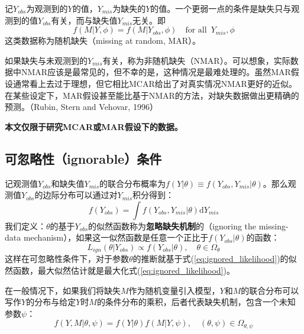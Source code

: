 \documentclass[aps,pre,12pt,preprint,onecolumn,showpacs,showkeys,AutoFakeBold]{revtex4-1}
\def \d {\mathrm d}
\begin{document}
    记$Y_{obs}$为观测到的$Y$的值，$Y_{mis}$为缺失的$Y$的值。一个更弱一点的条件是缺失只与观测到的值$Y_{obs}$有关，而与缺失值$Y_{mis}$无关。即
    \begin{equation}\label{eq:MAR}
        f(M\vert Y,\phi)=f(M\vert Y_{obs} ,\phi)\quad \text{for all }\, Y_{mis}, \phi 
    \end{equation}
    这类数据称为随机缺失（missing at random, MAR）。
    
    如果缺失与未观测到的$Y_{mis}$有关，称为非随机缺失（NMAR）。可以想象，实际数据中NMAR应该是最常见的，但不幸的是，这种情况是最难处理的。虽然MAR假设通常看上去过于理想，但它相比MCAR给出了对真实情况NMAR更好的近似。在某些设定下，MAR假设甚至能比基于NMAR的方法，对缺失数据做出更精确的预测。（Rubin, Stern and Vehovar, 1996）

    \textbf{本文仅限于研究MCAR或MAR假设下的数据。}

    \subsection{可忽略性（ignorable）条件}
    记观测值$Y_{obs}$和缺失值$Y_{mis}$的联合分布概率为$f(Y\vert \theta)\equiv f(Y_{obs}, Y_{mis}\vert \theta)$。那么观测值$Y_{obs}$的边际分布可以通过对$Y_{mis}$积分得到：
    \begin{equation}
        f(Y_{obs})=\int f(Y_{obs}, Y_{mis}\vert \theta)\d Y_{mis}
    \end{equation}
    我们定义：$\theta$的基于$Y_{obs}$的似然函数称为\textbf{忽略缺失机制}的（ignoring the missing-data mechanism），如果这一似然函数是任意一个正比于$f(Y_{obs}\vert \theta)$的函数：
    \begin{equation}\label{eq:ignored_likelihood}
        L_{ign}(\theta\vert Y_{obs})\propto f(Y_{obs}\vert \theta),\quad \theta \in \Omega_\theta
    \end{equation}
    这样在可忽略性条件下，对于参数$\theta$的推断就基于式(\ref{eq:ignored_likelihood})的似然函数，最大似然估计就是最大化式(\ref{eq:ignored_likelihood})。

    在一般情况下，如果我们将缺失$M$作为随机变量引入模型，$Y$和$M$的联合分布可以写作$Y$的分布与给定$Y$时$M$的条件分布的乘积，后者代表缺失机制，包含一个未知参数$\psi$：
    \begin{equation}\label{eq:joint}
        f(Y,M\vert \theta, \psi)=f(Y\vert \theta) f(M\vert Y,\psi),\quad (\theta, \psi)\in \Omega _{\theta, \psi}
    \end{equation}
    
\end{document}
